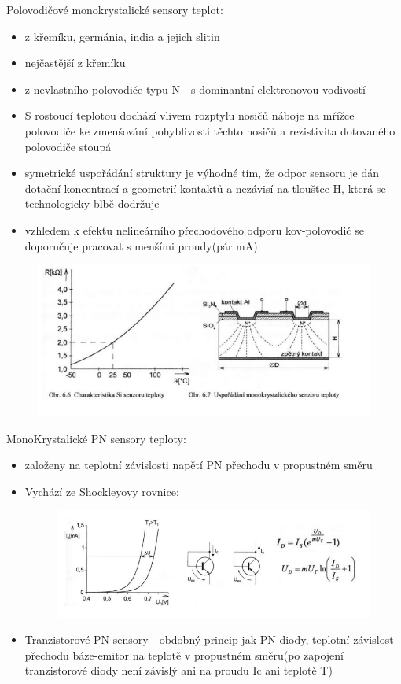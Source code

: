 Polovodičové monokrystalické sensory teplot:
\begin{itemize}
    \item z křemíku, germánia, india a jejich slitin 
    \item nejčastější z křemíku 
    \item z nevlastního polovodiče typu N - s dominantní elektronovou vodivostí 
    \item S rostoucí teplotou dochází vlivem rozptylu nosičů náboje na mřížce polovodiče ke zmenšování pohyblivosti těchto nosičů a rezistivita dotovaného polovodiče stoupá
    \item symetrické uspořádání struktury je výhodné tím, že odpor sensoru je dán dotační koncentrací a geometrií kontaktů a nezávisí na tloušťce H, která se technologicky blbě dodržuje
    \item vzhledem k efektu nelineárního přechodového odporu kov-polovodič se doporučuje pracovat s menšími proudy(pár mA) 
\end{itemize}
\begin{figure}[H]
    \includegraphics*[scale = 1.2]{img/odporoveSnimaceSi.png}
\end{figure}

MonoKrystalické PN sensory teploty:
\begin{itemize}
    \item založeny na teplotní závislosti napětí PN přechodu v propustném směru 
    \item Vychází ze Shockleyovy rovnice:
    \begin{figure}[H]
        \includegraphics*[scale = 1.2]{img/odporoveSnimacePN.png}
    \end{figure}
    \item Tranzistorové PN sensory - obdobný princip jak PN diody, teplotní závislost přechodu báze-emitor na teplotě v propustném směru(po zapojení tranzistorové diody není závislý ani na proudu Ic ani teplotě T)
\end{itemize}

